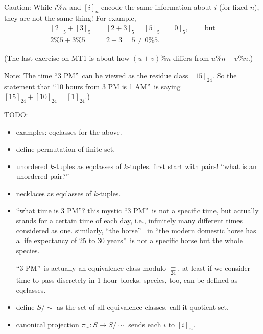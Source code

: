 \documentclass[numbers=enddot,12pt,final,onecolumn,notitlepage]{scrartcl}%
\newcounter{exer}
\numberwithin{exer}{subsection}
\theoremstyle{definition}
\begin{document}
Caution: While $i\%n$ and $\left[  i\right]  _{n}$ encode the same information
about $i$ (for fixed $n$), they are not the same thing! For example,%
\begin{align*}
\left[  2\right]  _{5}+\left[  3\right]  _{5}  &  =\left[  2+3\right]
_{5}=\left[  5\right]  _{5}=\left[  0\right]  _{5}%
,\ \ \ \ \ \ \ \ \ \ \text{but}\\
2\%5+3\%5  &  =2+3=5\neq0\%5.
\end{align*}


(The last exercise on MT1 is about how $\left(  u+v\right)  \%n$ differs from
$u\%n+v\%n$.)

Note: The time \textquotedblleft3 PM\textquotedblright\ can be viewed as the
residue class $\left[  15\right]  _{24}$. So the statement that
\textquotedblleft10 hours from 3 PM is 1 AM\textquotedblright\ is saying
$\left[  15\right]  _{24}+\left[  10\right]  _{24}=\left[  1\right]  _{24}$.)

TODO:

\begin{itemize}
\item examples: eqclasses for the above.

\item define permutation of finite set.

\item unordered $k$-tuples as eqclasses of $k$-tuples. first start with pairs!
\textquotedblleft what is an unordered pair?\textquotedblright

\item necklaces as eqclasses of $k$-tuples.

\item \textquotedblleft what time is 3 PM\textquotedblright? this mystic
\textquotedblleft3 PM\textquotedblright\ is not a specific time, but actually
stands for a certain time of each day, i.e., infinitely many different times
considered as one. similarly, \textquotedblleft the horse\textquotedblright%
\ in \textquotedblleft the modern domestic horse has a life expectancy of 25
to 30 years\textquotedblright\ is not a specific horse but the whole species.

\textquotedblleft3 PM\textquotedblright\ is actually an equivalence class
modulo $\underset{24}{\equiv}$, at least if we consider time to pass
discretely in 1-hour blocks. species, too, can be defined as eqclasses.

\item define $S/\sim$ as the set of all equivalence classes. call it quotient set.

\item canonical projection $\pi_{\sim}:S\rightarrow S/\sim$ sends each $i$ to
$\left[  i\right]  _{\sim}$.
\end{itemize}
\end{document}
